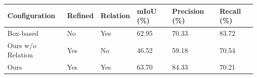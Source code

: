 \begin{tabular}{llllll}
\hline
Configuration & Refined & Relation & mIoU (\%) & Precision (\%) & Recall (\%) \\
\hline
Box-based & No & Yes & 62.95 & 70.33 & 83.72 \\
Ours w/o Relation & Yes & No & 46.52 & 59.18 & 70.54 \\
Ours & Yes & Yes & 63.70 & 84.33 & 70.21 \\
\hline
\end{tabular}
